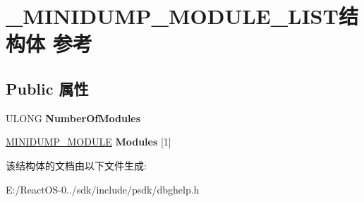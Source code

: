 \hypertarget{struct___m_i_n_i_d_u_m_p___m_o_d_u_l_e___l_i_s_t}{}\section{\+\_\+\+M\+I\+N\+I\+D\+U\+M\+P\+\_\+\+M\+O\+D\+U\+L\+E\+\_\+\+L\+I\+S\+T结构体 参考}
\label{struct___m_i_n_i_d_u_m_p___m_o_d_u_l_e___l_i_s_t}
\subsection*{Public 属性}
\begin{DoxyCompactItemize}
\item 
\mbox{\label{struct___m_i_n_i_d_u_m_p___m_o_d_u_l_e___l_i_s_t_a7a3e742227813281344c8fd4d2731442}} 
U\+L\+O\+NG {\bfseries Number\+Of\+Modules}
\item 
\mbox{\label{struct___m_i_n_i_d_u_m_p___m_o_d_u_l_e___l_i_s_t_a441dc41d7d765fd0bd68b319a3655b0d}} 
\hyperlink{struct___m_i_n_i_d_u_m_p___m_o_d_u_l_e}{M\+I\+N\+I\+D\+U\+M\+P\+\_\+\+M\+O\+D\+U\+LE} {\bfseries Modules} \mbox{[}1\mbox{]}
\end{DoxyCompactItemize}


该结构体的文档由以下文件生成\+:\begin{DoxyCompactItemize}
\item 
E\+:/\+React\+O\+S-\/0../sdk/include/psdk/dbghelp.\+h\end{DoxyCompactItemize}
